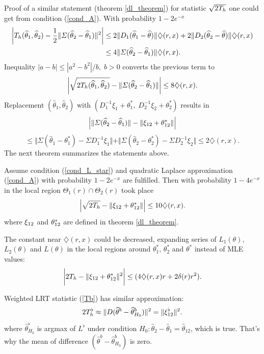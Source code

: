 Proof of  a similar statement (theorem \ref{dl_theorem}) for statistic $\sqrt{2 T_h}$ one could get from condition (\ref{cond_A}). With probability $1 - 2e^{-x}$
\begin{align*}
\left| T_h (\widehat{\theta}_1, \widehat{\theta}_2) - \frac{1}{2} \Vert \varSigma (\widehat{\theta}_2 -\widehat{\theta}_1) \Vert^2 \right|  
&\leq
2 \Vert D_1(\widehat{\theta}_1 - \widehat{\theta}) \Vert \diamondsuit (r, x) + 2 \Vert D_2(\widehat{\theta}_2 - \widehat{\theta}) \Vert \diamondsuit (r, x) \\ 
&\leq  4  \Vert  \varSigma(\widehat{\theta}_2 - \widehat{\theta}_1)  \Vert  \diamondsuit (r, x).
\end{align*}
Inequality $|a - b| \leq |a^2 - b^2| / b, \; b >0$ converts the previous term to
\[
\left| \sqrt{ 2  T_h (\widehat{\theta}_1, \widehat{\theta}_2) } -  \Vert \varSigma (\widehat{\theta}_2 -\widehat{\theta}_1) \Vert \right| \leq 
8   \diamondsuit (r, x).
\]
Replacement $(\widehat{\theta}_1, \widehat{\theta}_2)$ with $(D_1^{-1}\xi_1 + \theta_1^*, \; D_2^{-1}\xi_2 + \theta_2^*)$ results in
\[
\left| \Vert \varSigma (\widehat{\theta}_2 -\widehat{\theta}_1) \Vert  - 
\Vert  \xi_{12} +  \theta_{12}^* \Vert 
\right | 
\]
\[
\leq  \Vert \Sigma(\widehat{\theta}_1 - \theta_1^*) - \Sigma D_1^{-1} \xi_1 \Vert
+ \Vert \Sigma(\widehat{\theta}_2 - \theta_2^*) - \Sigma D_2^{-1} \xi_2 \Vert
\leq  2 \diamondsuit (r, x).
\]
The next theorem summarizes the statements above.  
\begin{theorem}
\label{dl_sq_theorem}
Assume condition (\ref{cond_L_star}) and quadratic Laplace approximation (\ref{cond_A}) with probability $1 - 2 e^{-x}$ are fulfilled. Then  with probability $1 - 4 e^{-x}$ in the local region  $\Theta_1(r) \cap \Theta_2(r)$ took place
\[
\left| 
\sqrt{ 2T_h} - 
\Vert \xi_{12} + \theta_{12}^* \Vert 
\right| \leq 
10  \diamondsuit (r, x).
\]
where $\xi_{12}$ and $\theta_{12}^*$ are defined in theorem \ref{dl_theorem}.
\end{theorem}

\begin{remark}
 The constant near  $\diamondsuit (r, x)$ could be decreased,  expanding  series of $L_1(\theta)$, $L_2(\theta)$ and $L(\theta)$ in the local regions around $\theta_1^*$, $\theta_2^*$ and $\theta^*$ instead of MLE values:
\[
\bigg |
2 T_h  -  \Vert  \xi_{12} +  \theta_{12}^* \Vert^2 
\bigg | 
\leq (4 \diamondsuit (r, x) r + 2 \delta(r) r^2).
\]
\end{remark}

\begin{remark}
Weighted LRT statistic (\ref{Tb}) has  similar approximation:
\[
2 T_h^{\flat} \approx  \Vert D(\widehat{\theta}^b - \widehat{\theta}_{H_0}^b)  \Vert^2 =  \Vert \xi_{12}^{\flat}  \Vert^2.
\] 
where $\widehat{\theta}^{\flat}_{H_0}$ is argmax of $L^{\flat}$ under condition $H_0: \widehat{\theta}_2 - \widehat{\theta}_1 = \widehat{\theta}_{12}$, which is true. That's why the mean of difference $(\widehat{\theta}^b - \widehat{\theta}_{H_0}^b)$  is zero.
\end{remark}

